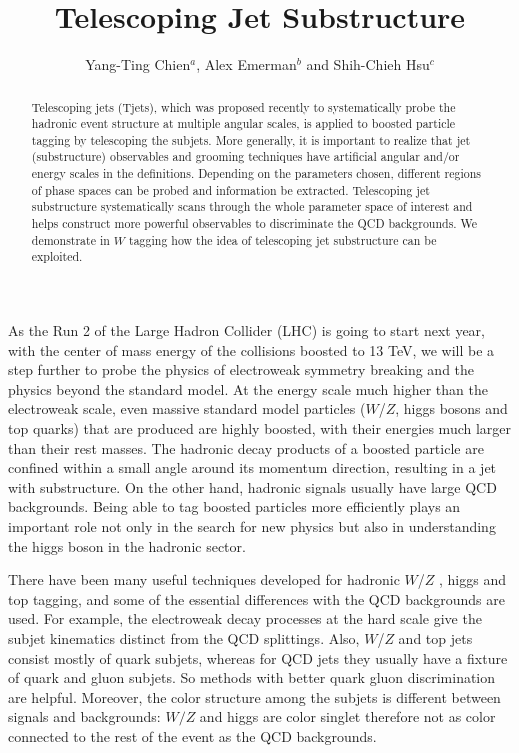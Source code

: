 \documentclass[aps,prl,floatfix,twocolumn,footinbib,amsmath,amssymb]{revtex4}
\begin{document}
\topmargin 0.0in

\title{Telescoping Jet Substructure}
\author{Yang-Ting Chien$^a$, Alex Emerman$^b$ and Shih-Chieh Hsu$^c$}

\begin{abstract}
Telescoping jets (Tjets), which was proposed recently to systematically probe the hadronic event structure at multiple angular scales, is applied to boosted particle tagging by telescoping the subjets. More generally, it is important to realize that jet (substructure) observables and grooming techniques have artificial angular and/or energy scales in the definitions. Depending on the parameters chosen, different regions of phase spaces can be probed and information be extracted. Telescoping jet substructure systematically scans through the whole parameter space of interest and helps construct more powerful observables to discriminate the QCD backgrounds. We demonstrate in $W$ tagging how the idea of telescoping jet substructure can be exploited.
\end{abstract}
\maketitle

As the Run 2 of the Large Hadron Collider (LHC) is going to start next year, with the center of mass energy of the collisions boosted to 13 TeV, we will be a step further to probe the physics of electroweak symmetry breaking and the physics beyond the standard model. At the energy scale much higher than the electroweak scale, even massive standard model particles ($W$/$Z$, higgs bosons and top quarks) that are produced are highly boosted, with their energies much larger than their rest masses. The hadronic decay products of a boosted particle are confined within a small angle around its momentum direction, resulting in a jet with substructure. On the other hand, hadronic signals usually have large QCD backgrounds. Being able to tag boosted particles more efficiently plays an important role not only in the search for new physics but also in understanding the higgs boson in the hadronic sector.

There have been many useful techniques developed for hadronic $W$/$Z$ \cite{Cui:2010km}, higgs and top tagging, and some of the essential differences with the QCD backgrounds are used. For example, the electroweak decay processes at the hard scale give the subjet kinematics distinct from the QCD splittings. Also, $W$/$Z$ and top jets consist mostly of quark subjets, whereas for QCD jets they usually have a fixture of quark and gluon subjets. So methods with better quark gluon discrimination are helpful. Moreover, the color structure among the subjets is different between signals and backgrounds: $W/Z$ and higgs are color singlet therefore not as color connected to the rest of the event as the QCD backgrounds.
\end{document}
